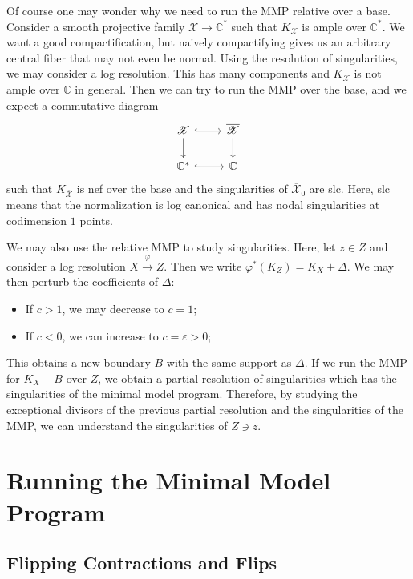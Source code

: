 \documentclass[leqno, openany]{memoir}
\theoremstyle{definition}
\theoremstyle{remark}
\theoremstyle{plain}
\theoremstyle{definition}
\theoremstyle{remark}
\newcommand{\C}{\mathbb{C}}
\newcommand{\ep}{\varepsilon}
\newcommand{\msc}[1]{\mathscr{#1}}
\newcommand{\ol}[1]{\overline{#1}}
\begin{document}
Of course one may wonder why we need to run the MMP relative over a base. Consider a smooth projective family $\msc{X} \to \C^*$ such that $K_{\msc{X}}$ is ample over $\C^*$. We want a good compactification, but naively compactifying gives us an arbitrary central fiber that may not even be normal. Using the resolution of singularities, we may consider a log resolution. This has many components and $K_{\msc{X}}$ is not ample over $\C$ in general. Then we can try to run the MMP over the base, and we expect a commutative diagram
\begin{equation*}
\begin{tikzcd}
    \msc{X} \ar[hookrightarrow]{r} \ar{d} & \ol{\msc{X}} \ar{d} \\
    \C^* \ar[hookrightarrow]{r} & \C
\end{tikzcd}
\end{equation*}
such that $K_{\ol{\msc{X}}}$ is nef over the base and the singularities of $\ol{\msc{X}}_0$ are slc. Here, slc means that the normalization is log canonical and has nodal singularities at codimension $1$ points.

We may also use the relative MMP to study singularities. Here, let $z \in Z$ and consider a log resolution $X \xrightarrow{\varphi} Z$. Then we write $\varphi^*(K_Z) = K_X + \Delta$. We may then perturb the coefficients of $\Delta$:
\begin{itemize}
    \item If $c > 1$, we may decrease to $c = 1$;
    \item If $c < 0$, we can increase to $c = \ep > 0$;
\end{itemize}
This obtains a new boundary $B$ with the same support as $\Delta$. If we run the MMP for $K_X + B$ over $Z$, we obtain a partial resolution of singularities which has the singularities of the minimal model program. Therefore, by studying the exceptional divisors of the previous partial resolution and the singularities of the MMP, we can understand the singularities of $Z \ni z$.

\section{Running the Minimal Model Program}%
\label{sec:running_the_minimal_model_program}

\subsection{Flipping Contractions and Flips}%
\label{sub:flipping_contractions_and_flips}
\end{document}
